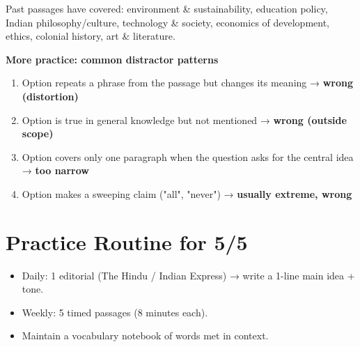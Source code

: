 Past passages have covered: environment \& sustainability, education policy, Indian philosophy/culture,
technology \& society, economics of development, ethics, colonial history, art \& literature.

\textbf{More practice: common distractor patterns}

\begin{enumerate}
\def\labelenumi{\arabic{enumi}.}
\setcounter{enumi}{7}
\tightlist
\item
  Option repeats a phrase from the passage but changes its meaning → \textbf{wrong (distortion)}
\item
  Option is true in general knowledge but not mentioned → \textbf{wrong (outside scope)}
\item
  Option covers only one paragraph when the question asks for the central idea → \textbf{too narrow}
\item
  Option makes a sweeping claim ("all", "never") → \textbf{usually extreme, wrong}
\end{enumerate}

\needspace{95pt}

\hypertarget{p1-03--practice-routine-for-55}{%
\section{Practice Routine for 5/5}\label{p1-03--practice-routine-for-55}}

\begin{itemize}
\tightlist
\item
  Daily: 1 editorial (The Hindu / Indian Express) → write a 1-line main idea + tone.
\item
  Weekly: 5 timed passages (8 minutes each).
\item
  Maintain a vocabulary notebook of words met in context.
\end{itemize}
